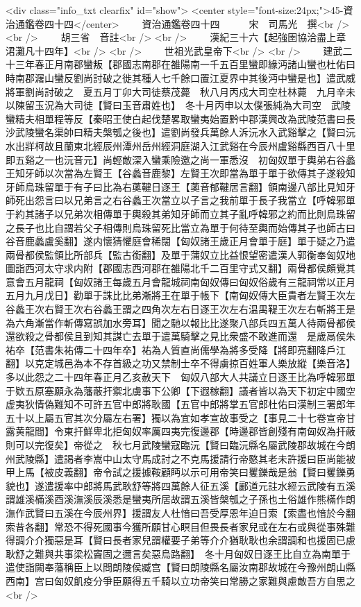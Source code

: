 <div class="info_txt clearfix" id="show">
<center style="font-size:24px;">45-資治通鑑卷四十四</center>
  　　資治通鑑卷四十四　　　宋　司馬光　撰<br />
<br />
　　胡三省　音註<br />
<br />
　　漢紀三十六【起強圉協洽盡上章涒灘凡十四年】<br />
<br />
　　世祖光武皇帝下<br />
<br />
　　建武二十三年春正月南郡蠻叛【郡國志南郡在雒陽南一千五百里蠻即緣沔諸山蠻也杜佑曰時南郡潳山蠻反劉尚討破之徙其種人七千餘口置江夏界中其後沔中蠻是也】遣武威將軍劉尚討破之　夏五月丁卯大司徒蔡茂薨　秋八月丙戍大司空杜林薨　九月辛未以陳留玉況為大司徒【賢曰玉音肅姓也】　冬十月丙申以太僕張純為大司空　武陵蠻精夫相單程等反【秦昭王使白起伐楚畧取蠻夷始置黔中郡漢興改為武陵范書曰長沙武陵蠻名渠帥曰精夫槃瓠之後也】遣劉尚發兵萬餘人泝沅水入武谿擊之【賢曰沅水出牂柯故且蘭東北經辰州潭州岳州經洞庭湖入江武谿在今辰州盧谿縣西百八十里即五谿之一也沅音元】尚輕敵深入蠻乘險邀之尚一軍悉沒　初匈奴單于輿弟右谷蠡王知牙師以次當為左賢王【谷蠡音鹿黎】左賢王次即當為單于單于欲傳其子遂殺知牙師烏珠留單于有子曰比為右薁鞬日逐王【薁音郁鞬居言翻】領南邊八部比見知牙師死出怨言曰以兄弟言之右谷蠡王次當立以子言之我前單于長子我當立【呼韓邪單于約其諸子以兄弟次相傳單于輿殺其弟知牙師而立其子亂呼韓邪之約而比則烏珠留之長子也比自謂若父子相傳則烏珠留死比當立為單于何待至輿而始傳其子也師古曰谷音鹿蠡盧奚翻】遂内懷猜懼庭會稀闊【匈奴諸王歲正月會單于庭】單于疑之乃遣兩骨都侯監領比所部兵【監古銜翻】及單于蒲奴立比益恨望密遣漢人郭衡奉匈奴地圖詣西河太守求内附【郡國志西河郡在雒陽北千二百里守式又翻】兩骨都侯頗覺其意會五月龍祠【匈奴諸王每歲五月會龍城祠南匈奴傳曰匈奴俗歲有三龍祠常以正月五月九月戊日】勸單于誅比比弟漸將王在單于帳下【南匈奴傳大臣貴者左賢王次左谷蠡王次右賢王次右谷蠡王謂之四角次左右日逐王次左右温禺鞮王次左右斬將王是為六角漸當作斬傳寫誤加水旁耳】聞之馳以報比比遂聚八部兵四五萬人待兩骨都侯還欲殺之骨都侯且到知其謀亡去單于遣萬騎擊之見比衆盛不敢進而還　是歲鬲侯朱祐卒【范書朱祐傳二十四年卒】祐為人質直尚儒學為將多受降【將即亮翻降戶江翻】以克定城邑為本不存首級之功又禁制士卒不得虜掠百姓軍人樂放縱【樂音洛】多以此怨之二十四年春正月乙亥赦天下　匈奴八部大人共議立日逐王比為呼韓邪單于欵五原塞願永為藩蔽扞禦北虜事下公卿【下遐稼翻】議者皆以為天下初定中國空虚夷狄情偽難知不可許五官中郎將耿國【五官中郎將掌五官郎杜佑曰漢制三署郎年五十以上屬五官其次分屬左右署】獨以為宜如孝宣故事受之【事見二十七卷宣帝甘露黄龍間】令東扞鮮卑北拒匈奴率厲四夷完復邊郡【時邊郡皆創殘有南匈奴為扞蔽則可以完復矣】帝從之　秋七月武陵蠻寇臨沅【賢曰臨沅縣名屬武陵郡故城在今朗州武陵縣】遣謁者李嵩中山太守馬成討之不克馬援請行帝愍其老未許援曰臣尚能被甲上馬【被皮義翻】帝令試之援據鞍顧眄以示可用帝笑曰矍鑠哉是翁【賢曰矍鑠勇貌也】遂遣援率中郎將馬武耿舒等將四萬餘人征五溪【酈道元註水經云武陵有五溪謂雄溪樠溪酉溪潕溪辰溪悉是蠻夷所居故謂五溪皆槃瓠之子孫也土俗雄作熊樠作朗潕作武賢曰五溪在今辰州界】援謂友人杜愔曰吾受厚恩年迫日索【索盡也愔於今翻索昔各翻】常恐不得死國事今獲所願甘心瞑目但畏長者家兒或在左右或與從事殊難得調介介獨惡是耳【賢曰長者家兒謂權要子弟等介介猶耿耿也余謂調和也援固已慮耿舒之難與共事梁松竇固之邇言矣惡烏路翻】　冬十月匈奴日逐王比自立為南單于遣使詣闕奉藩稱臣上以問朗陵侯臧宫【賢曰朗陵縣名屬汝南郡故城在今豫州朗山縣西南】宫曰匈奴飢疫分爭臣願得五千騎以立功帝笑曰常勝之家難與慮敵吾方自思之<br />
